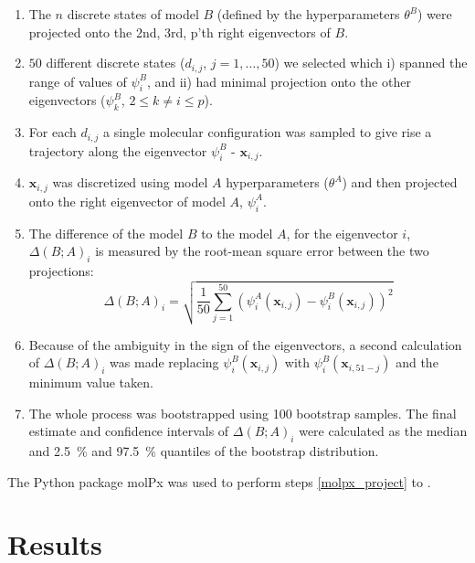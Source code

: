 \documentclass[journal=jacsat,manuscript=article]{achemso}
\begin{document}
\begin{enumerate}
    \item The $n$ discrete states of model $B$  (defined by the hyperparameters $\theta^{B}$) were projected onto the 2nd, 3rd, p'th right eigenvectors of $B$.  \label{molpx_project}
    \item $50$ different discrete states ($d_{i,j}$, $j = 1,\ldots, 50$) we selected which i) spanned the range of values of $\psi^{B}_{i}$, and ii) had minimal projection onto the other eigenvectors ($\psi^{B}_{k}$, $2 \le k \ne i \le p$). \label{molpx_sample}
    \item For each $d_{i,j}$ a single molecular configuration was sampled to give rise a trajectory along the eigenvector $\psi^{B}_{i}$ - $\mathbf{x}_{i, j}$.  \label{molpx_configs}
    \item $\mathbf{x}_{i, j}$ was discretized using model $A$ hyperparameters ($\theta^{A}$) and then projected onto the right eigenvector of model $A$, $\psi^{A}_{i}$. 
    \item The difference of the model $B$ to the model $A$, for the eigenvector $i$, $\Delta(B; A)_{i}$ is measured by the root-mean square error between the two projections:
    \begin{equation}
        \Delta(B; A)_{i} = \sqrt{\frac{1}{50}\sum_{j=1}^{50} \left(\psi^{A}_{i}(\mathbf{x}_{i, j})- \psi^{B}_{i}(\mathbf{x}_{i, j})\right )^{2}}
    \end{equation}\label{eqn:overlap}
    \item Because of the ambiguity in the sign of the eigenvectors, a second calculation of  $\Delta(B; A)_{i}$ was made replacing $\psi^{B}_{i}(\mathbf{x}_{i, j})$ with $\psi^{B}_{i}(\mathbf{x}_{i, 51-j})$ and the minimum value taken.  
    \item The whole process was bootstrapped using \num{100} bootstrap samples. The final estimate and confidence intervals of $\Delta(B; A)_{i}$ were calculated as the median and \SI{2.5}{\percent} and \SI{97.5}{\percent} quantiles of the bootstrap distribution.  
\end{enumerate}

The Python package molPx was used to perform steps \ref{molpx_project} to \label{molpx_configs}. 



\section{Results}
\end{document}
